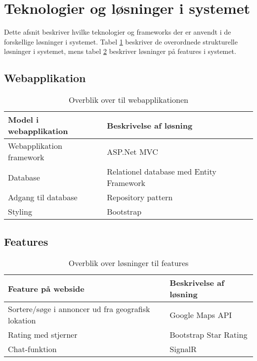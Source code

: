 \section{Teknologier og løsninger i systemet}
Dette afsnit beskriver hvilke teknologier og frameworks der er anvendt i de forskellige løsninger i systemet. Tabel \ref{fig:Webapplikation} beskriver de overordnede strukturelle løsninger i systemet, mens tabel \ref{fig:Features} beskriver løsninger på features i systemet.
\subsection{Webapplikation}

\begin{table}[H]
	\begin{tabular}{ | l | l |}
		\hline
		\textbf{Model i webapplikation}  & \textbf{Beskrivelse af løsning} \\ \hline
		Webapplikation framework  & ASP.Net MVC \\ \hline
		Database & Relationel database med Entity Framework \\ \hline
		Adgang til database & Repository pattern \\ \hline
		Styling & Bootstrap	 \\ \hline
	\end{tabular}
	\caption{Overblik over til webapplikationen}
	\label{fig:Webapplikation}
\end{table}

\subsection{Features}

\begin{table}[H]
	\begin{tabular}{ | l | p{5cm} |}
		\hline
		\textbf{Feature på webside}  & \textbf{Beskrivelse af løsning} \\ \hline
		Sortere/søge i annoncer ud fra geografisk lokation  & Google Maps API \\ \hline
		Rating med stjerner & Bootstrap Star Rating \\ \hline
		Chat-funktion & SignalR \\ \hline
		
	\end{tabular}
	\caption{Overblik over løsninger til features}
	\label{fig:Features}
\end{table}

